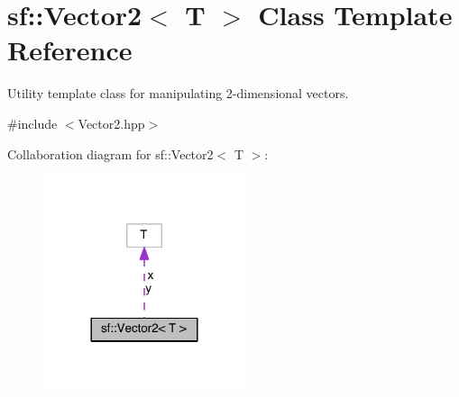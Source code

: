 \hypertarget{classsf_1_1_vector2}{\section{sf\-:\-:Vector2$<$ T $>$ Class Template Reference}
\label{classsf_1_1_vector2}
}


Utility template class for manipulating 2-\/dimensional vectors.  




{\ttfamily \#include $<$Vector2.\-hpp$>$}



Collaboration diagram for sf\-:\-:Vector2$<$ T $>$\-:
\nopagebreak
\begin{figure}[H]
\begin{center}
\leavevmode
\includegraphics[width=168pt]{classsf_1_1_vector2__coll__graph}
\end{center}
\end{figure}
